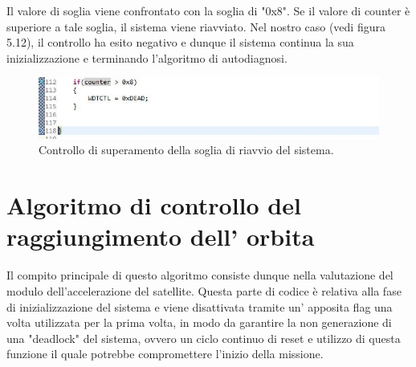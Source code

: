\documentclass[LaM,binding=0.6cm,oneside]{../sapthesis}
\begin{document}
Il valore di soglia viene confrontato con la soglia di "0x8". Se il valore di counter è superiore a tale soglia, il sistema viene riavviato. Nel nostro caso (vedi figura 5.12), il controllo ha esito negativo e dunque il sistema continua la sua inizializzazione e terminando l'algoritmo di autodiagnosi.\newline

\begin{figure}[htbp]
\centerline{\includegraphics[scale=0.7]{examples/9_ControlloDelNumeroDiFaultNO_RIAVVIO.JPG}}
\caption{Controllo di superamento della soglia di riavvio del sistema.}
\label{fig}
\end{figure}


\newpage





\chapter{Algoritmo di controllo del raggiungimento dell' orbita}
Il compito principale di questo algoritmo consiste dunque nella valutazione del modulo dell’accelerazione del satellite. Questa parte di codice è relativa alla fase di inizializzazione del sistema e viene disattivata tramite un' apposita flag una volta utilizzata per la prima volta, in modo da garantire la non generazione di una "deadlock" del sistema, ovvero un ciclo continuo di reset e utilizzo di questa funzione il quale potrebbe compromettere l'inizio della missione.
\end{document}
